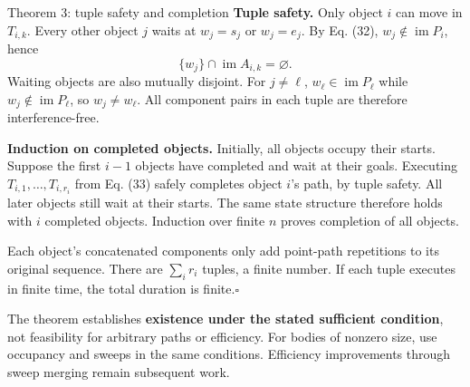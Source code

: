 \begin{frame}{Theorem 3: tuple safety and completion}
\small
\textbf{Tuple safety.} Only object $i$ can move in $T_{i,k}$.
Every other object $j$ waits at $w_j=s_j$ or $w_j=e_j$.
By Eq. (32), $w_j\notin\operatorname{im}P_i$, hence
\begin{equation}
 \{w_j\}\cap\operatorname{im}A_{i,k}=\varnothing.
 \tag{34}
\end{equation}
Waiting objects are also mutually disjoint. For $j\ne\ell$,
$w_\ell\in\operatorname{im}P_\ell$ while $w_j\notin\operatorname{im}P_\ell$, so
$w_j\ne w_\ell$. All component pairs in each tuple are therefore interference-free.
\par\medskip
\textbf{Induction on completed objects.} Initially, all objects occupy their starts.
Suppose the first $i-1$ objects have completed and wait at their goals.
Executing $T_{i,1},\ldots,T_{i,r_i}$ from Eq. (33) safely completes object $i$'s path,
by tuple safety. All later objects still wait at their starts.
The same state structure therefore holds with $i$ completed objects.
Induction over finite $n$ proves completion of all objects.
\par\medskip
Each object's concatenated components only add point-path repetitions to its original sequence.
There are $\sum_i r_i$ tuples, a finite number. If each tuple executes in finite time, the total duration
is finite.\hfill$\square$
\par\medskip\footnotesize
The theorem establishes \textbf{existence under the stated sufficient condition}, not feasibility for arbitrary paths
or efficiency. For bodies of nonzero size, use occupancy and sweeps in the same conditions.
Efficiency improvements through sweep merging remain subsequent work.
\end{frame}


